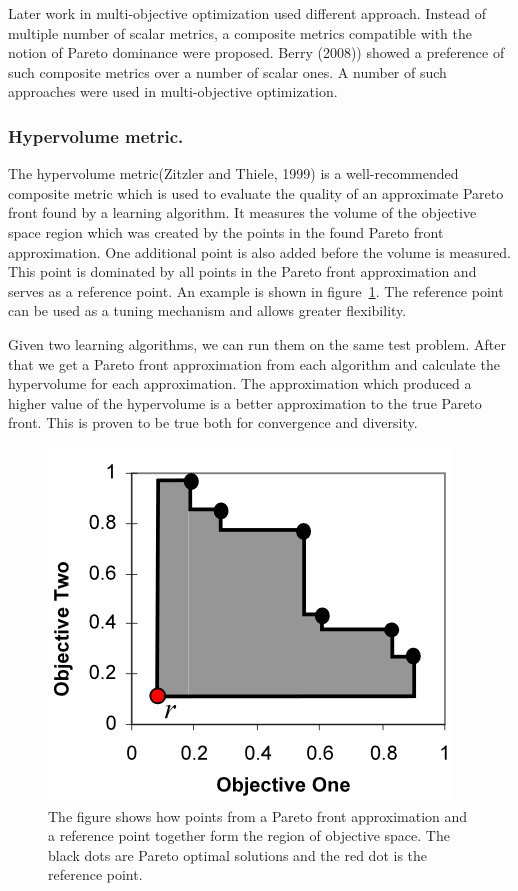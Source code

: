 Later work in multi-objective optimization used different approach. Instead of multiple number of scalar metrics, a composite metrics compatible with the notion of Pareto dominance were proposed. Berry (2008)\nocite{berry2008phd}) showed a preference of such composite metrics over a number of scalar ones. A number of such approaches were used in multi-objective optimization.

\subsubsection{Hypervolume metric.}

The hypervolume metric(Zitzler and Thiele, 1999\nocite{zitzler1999pareto}) is a well-recommended composite metric which is used to evaluate the quality of an approximate Pareto front found by a learning algorithm. It measures the volume of the objective space region which was created by the points in the found Pareto front approximation. One additional point is also added before the volume is measured. This point is dominated by all points in the Pareto front approximation and serves as a reference point. An example is shown in figure~\ref{fig:hyperVolume}. The reference point can be used as a tuning mechanism and allows greater flexibility.

Given two learning algorithms, we can run them on the same test problem. After that we get a Pareto front approximation from each algorithm and calculate the hypervolume for each approximation. The approximation which produced a higher value of the hypervolume is a better approximation to the true Pareto front. This is proven to be true both for convergence and diversity.

\begin{figure}[ht]
\centering
\includegraphics[scale=0.9]{hypervolume.png}
\caption{The figure shows how points from a Pareto front approximation and a reference point together form the region of objective space. The black dots are Pareto optimal solutions and the red dot is the reference point.}
\label{fig:hyperVolume}
\end{figure}

